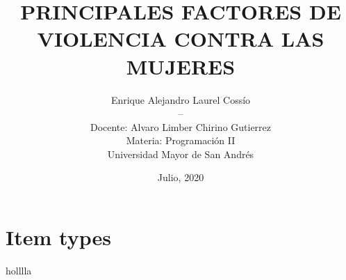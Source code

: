\documentclass[11pt, letter]{article}
\title{{\Large \textbf{PRINCIPALES FACTORES DE VIOLENCIA CONTRA LAS MUJERES}}}
\author{ Enrique Alejandro Laurel Cossío\\--\\Docente: Alvaro Limber Chirino Gutierrez\\Materia: Programación II\\ Universidad Mayor de San Andrés}
\date{Julio, 2020}
\begin{document}

\maketitle

\section{Item types}
holllla\cite{cruz2019factores}
%

%

\end{document}
